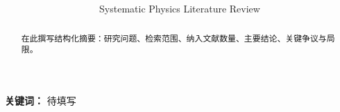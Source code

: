 \documentclass[UTF8,12pt,openany]{ctexrep}
\title{\bfseries\color{ReviewNavy}\ReviewTitle}
\author{Systematic Physics Literature Review}
\date{\ReviewDate}
\begin{document}
\maketitle

\begin{abstract}
在此撰写结构化摘要：研究问题、检索范围、纳入文献数量、主要结论、关键争议与局限。
\end{abstract}

\noindent\textbf{关键词：} 待填写

\tableofcontents

\begin{center}
\end{center}

% 
% 
% 



\end{document}
